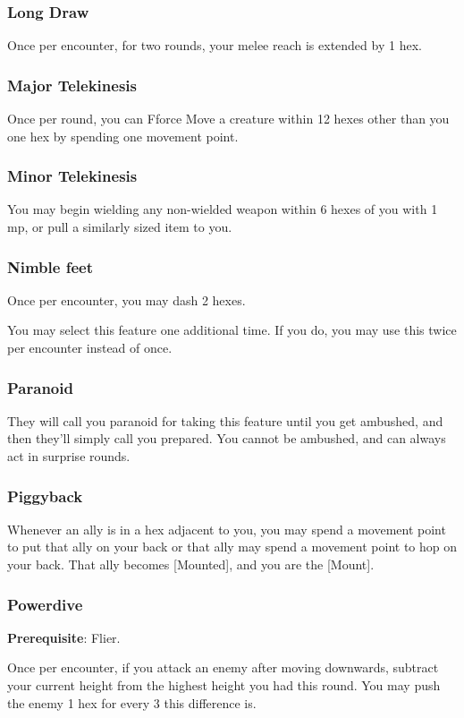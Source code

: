 \begin{multicols*}{2}
\subsubsection{Long Draw}
Once per encounter, for two rounds, your melee reach is extended by 1 hex.

\subsubsection{Major Telekinesis \R }
Once per round, you can Fforce Move a creature within 12 hexes other than you one hex by spending one movement point.

\subsubsection{Minor Telekinesis}
You may begin wielding any non-wielded weapon within 6 hexes of you with 1 mp, or pull a similarly sized item to you.

\subsubsection{Nimble feet}
Once per encounter, you may dash 2 hexes.

You may select this feature one additional time. If you do, you may use this twice per encounter instead of once.

\subsubsection{Paranoid}
They will call you paranoid for taking this feature until you get ambushed, and then they’ll simply call you prepared.
You cannot be ambushed, and can always act in surprise rounds.

\subsubsection{Piggyback}
Whenever an ally is in a hex adjacent to you, you may spend a movement point to put that ally on your back or that ally may spend a movement point to hop on your back. That ally becomes [Mounted], and you are the [Mount].

\subsubsection{Powerdive}
\textbf{Prerequisite}: Flier.

Once per encounter, if you attack an enemy after moving downwards, subtract your current height from the  highest height  you had this round. You may push the enemy 1 hex for every 3 this difference is.


\end{multicols*}
